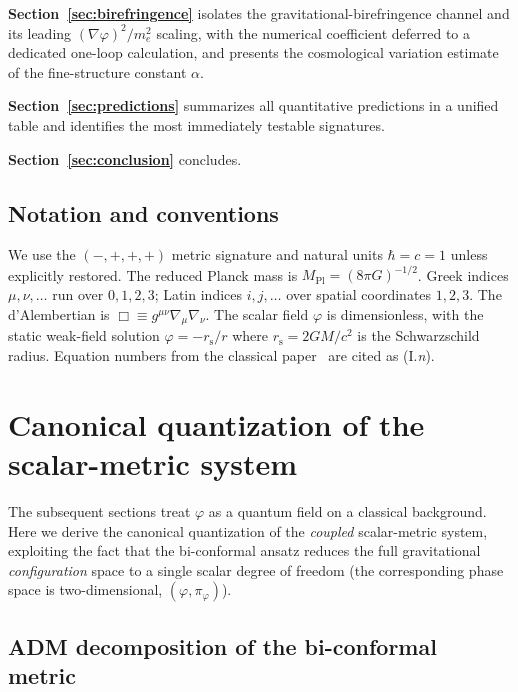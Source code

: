 \documentclass[aps,prd,onecolumn,superscriptaddress,nofootinbib,showpacs,12pt,notitlepage]{revtex4-2}
\newcommand{\Mpl}{M_{\mathrm{Pl}}}
\newcommand{\rs}{r_{\mathrm{s}}}
\begin{document}
\textbf{Section~\ref{sec:birefringence}} isolates the
gravitational-birefringence channel and its leading
$(\nabla\varphi)^2/m_e^2$ scaling, with the numerical
coefficient deferred to a dedicated one-loop calculation,
and presents the cosmological variation estimate of the
fine-structure constant $\alpha$.

\textbf{Section~\ref{sec:predictions}} summarizes all
quantitative predictions in a unified table and identifies the
most immediately testable signatures.

\textbf{Section~\ref{sec:conclusion}} concludes.

\subsection{Notation and conventions}

We use the $(-,+,+,+)$ metric signature and natural units
$\hbar = c = 1$ unless explicitly restored.  The reduced
Planck mass is $\Mpl = (8\pi G)^{-1/2}$.  Greek indices
$\mu,\nu,\ldots$ run over $0,1,2,3$; Latin indices $i,j,\ldots$
over spatial coordinates $1,2,3$.  The d'Alembertian is
$\Box \equiv g^{\mu\nu}\nabla_\mu\nabla_\nu$.  The scalar field
$\varphi$ is dimensionless, with the static weak-field solution
$\varphi = -\rs/r$ where $\rs = 2GM/c^2$ is the Schwarzschild
radius.  Equation numbers from the classical
paper~\cite{Lotishvili2026} are cited as (I.\emph{n}).

\section{Canonical quantization of the scalar-metric system}
\label{sec:canonical_quantization}

The subsequent sections treat $\varphi$ as a quantum field on
a classical background.  Here we derive the canonical
quantization of the \emph{coupled} scalar-metric system,
exploiting the fact that the bi-conformal ansatz reduces the
full gravitational \emph{configuration} space to a single
scalar degree of freedom (the corresponding phase space is
two-dimensional, $(\varphi,\pi_\varphi)$).

\subsection{ADM decomposition of the bi-conformal metric}
\label{sec:adm}
\end{document}
